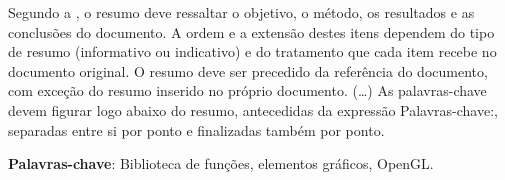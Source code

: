 \documentclass[12pt, %
openright,
oneside, %
a4paper,    %
brazil]{facom-ufu-abntex2}
\begin{document}







\begin{resumo} %
 Segundo a , o resumo deve ressaltar o
 objetivo, o método, os resultados e as conclusões do documento. A ordem e a extensão
 destes itens dependem do tipo de resumo (informativo ou indicativo) e do
 tratamento que cada item recebe no documento original. O resumo deve ser
 precedido da referência do documento, com exceção do resumo inserido no
 próprio documento. (\ldots) As palavras-chave devem figurar logo abaixo do
 resumo, antecedidas da expressão Palavras-chave:, separadas entre si por
 ponto e finalizadas também por ponto.

 \vspace{\onelineskip}

 \noindent
 \textbf{Palavras-chave}: Biblioteca de funções, elementos gráficos, OpenGL. %
\end{resumo}

\listoffigures*
\cleardoublepage

\iffalse
\pdfbookmark[0]{\listtablename}{lot}
\listoftables*
\cleardoublepage
\fi
\end{document}
